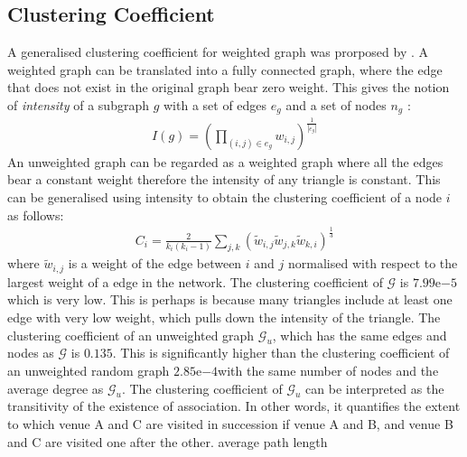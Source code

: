 \subsection{Clustering Coefficient}
A generalised clustering coefficient for weighted graph was prorposed by \cite{saramaki2007generalizations}. A weighted graph can be translated into a fully connected graph, where the edge that does not exist in the original graph bear zero weight. This gives the notion of \emph{intensity} of a subgraph $g$ with a set of edges $e_{g}$ and a set of nodes $n_{g}$ \citep{saramaki2007generalizations}:
\begin{align*}
I(g) = \left( \prod_{(i, j)\in e_{g}}^{}w_{i, j} \right)^{\frac{1}{|e_{g}|}}
\end{align*}
An unweighted graph can be regarded as a weighted graph where all the edges bear a constant weight therefore the intensity of any triangle is constant. This can be generalised using intensity to obtain the clustering coefficient of a node $i$ as follows\citep{saramaki2007generalizations}:
\begin{align*}
C_i = \frac{2}{k_i(k_i-1)}\sum_{j, k}^{}(\widetilde{w}_{i, j}\widetilde{w}_{j, k}\widetilde{w}_{k, i})^{\frac{1}{3}}
\end{align*}
where $\widetilde{w}_{i, j}$ is a weight of the edge between $i$ and $j$ normalised with respect to the largest weight of a edge in the network. 
The clustering coefficient of $\mathcal{G}$ is $7.99\mathrm{e}{-5}$ which is very low. This is perhaps is because many triangles include at least one edge with very low weight, which pulls down the intensity of the triangle.
The clustering coefficient of an unweighted graph $\mathcal{G}_u$, which has the same edges and nodes as $\mathcal{G}$ is $0.135$. This is significantly higher than the clustering coefficient of an unweighted random graph $2.85\mathrm{e}{-4}$with the same number of nodes and the average degree as $\mathcal{G}_u$. The clustering coefficient of  $\mathcal{G}_u$ can be interpreted as the transitivity of the existence of association. In other words, it quantifies the extent to which venue A and C are visited in succession if venue A and B, and venue B and C are visited one after the other.
\color{red}average path length \color{black}